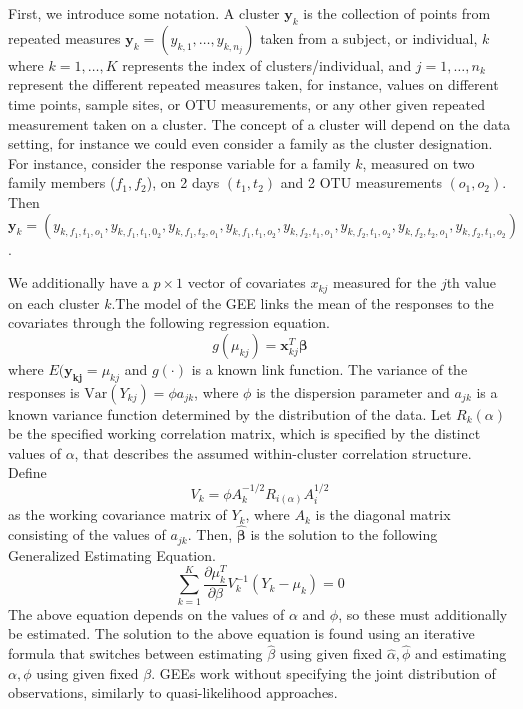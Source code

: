 \documentclass[12pt]{article}
\begin{document}
First, we introduce some notation. A cluster $\mathbf{y}_k$ is the collection of points from repeated measures $\mathbf{y}_k = (y_{k,1}, \ldots , y_{k,n_j})$ taken from a subject, or individual, $k$ where $k = 1, \ldots , K$ represents the index of clusters/individual, and $j = 1, \ldots , n_k$ represent the different repeated measures taken, for instance, values on different  time points, sample sites, or OTU measurements, or any other given repeated measurement taken on a cluster.
The concept of a cluster will depend on the data setting, for instance we could even consider a family as the cluster designation. For instance, consider the response variable for a family $k$, measured on two family members ($f_1,f_2$), on 2 days $(t_1,t_2)$ and 2 OTU measurements $(o_1,o_2)$. Then $\mathbf{y}_k = (y_{k, f_1,t_1,o_1}, y_{k, f_1,t_1,0_2}, y_{k, f_1,t_2,o_1}, y_{k, f_1,t_1,o_2},y_{k, f_2,t_1,o_1}, y_{k, f_2,t_1,o_2}, y_{k, f_2,t_2,o_1}, y_{k, f_2,t_1,o_2})$.

We additionally have a $p \times 1$ vector of covariates $x_{kj}$ measured for the $j$th value on each cluster $k$.The model of the GEE links the mean of the responses to the covariates through the following regression equation.
$$g(\mu_{kj}) = \mathbf{x}_{kj}^T\boldsymbol \beta$$
where $E(\mathbf{y_{kj}} = \mu_{kj}$ and $g(\cdot)$ is a known link function. The variance of the responses is $\text{Var}(Y_{kj}) = \phi a_{jk}$, where $\phi$ is the dispersion parameter and $a_{jk}$ is a known variance function determined by the distribution of the data. Let $R_k(\alpha)$ be the specified working correlation matrix, which is specified by the distinct values of $\alpha$, that describes the assumed within-cluster correlation structure. Define
$$V_k = \phi A_k^{-1/2} R_{i(\alpha)}A_i^{1/2}$$ as the working covariance matrix of $Y_k$, where $A_k$ is the diagonal matrix consisting of the values of $a_{jk}$. Then, $\hat{\boldsymbol\beta}$ is the solution to the following Generalized Estimating Equation.
$$\sum_{k=1}^K \frac{\partial  \mu_k^T }{\partial \beta } V_{k}^{-1} (Y_k - \mu_k) = 0 $$
The above equation depends on the values of $\alpha$ and $\phi$, so these must additionally be estimated. The solution to the above equation is found using an iterative formula that switches between estimating $\hat\beta$ using given fixed $\hat \alpha, \hat \phi$ and estimating $\alpha,  \phi$ using given fixed $\beta$. GEEs work without specifying the joint distribution of observations, similarly to quasi-likelihood approaches.
\end{document}
